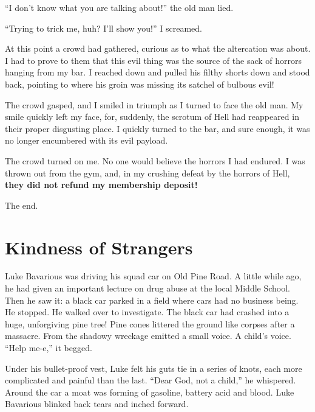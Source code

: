 ``I don't know what you are talking about!'' the old man lied.



``Trying to trick me, huh? I'll show you!'' I screamed.



At this point a crowd had gathered, curious as to what the
altercation was about. I had to prove to them that this evil thing
was the source of the sack of horrors hanging from my bar. I
reached down and pulled his filthy shorts down and stood back,
pointing to where his groin was missing its satchel of bulbous
evil!



The crowd gasped, and I smiled in triumph as I turned to face the
old man. My smile quickly left my face, for, suddenly, the scrotum
of Hell had reappeared in their proper disgusting place. I quickly
turned to the bar, and sure enough, it was no longer encumbered
with its evil payload.



The crowd turned on me. No one would believe the horrors I had
endured. I was thrown out from the gym, and, in my crushing defeat
by the horrors of Hell, {\bf they did not refund my membership
deposit!}



The end. 
 





\chapter{Kindness of Strangers}



Luke Bavarious was driving his squad car on Old Pine Road. A little
while ago, he had given an important lecture on drug abuse at the
local Middle School. Then he saw it: a black car parked in a field
where cars had no business being. He stopped. He walked over to
investigate. The black car had crashed into a huge, unforgiving
pine tree! Pine cones littered the ground like corpses after a
massacre. From the shadowy wreckage emitted a small voice. A
child's voice. ``Help me-e,'' it begged.



Under his bullet-proof vest, Luke felt his guts tie in a series of
knots, each more complicated and painful than the last. ``Dear
God, not a child,'' he whispered. Around the car a moat was
forming of gasoline, battery acid and blood. Luke Bavarious blinked
back tears and inched forward.



